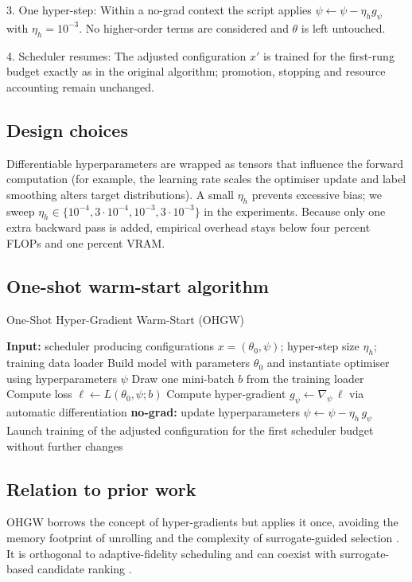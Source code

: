 \documentclass{article}
\begin{document}
3. One hyper-step: Within a no-grad context the script applies \(\psi \leftarrow \psi - \eta_h g_\psi\) with \(\eta_h = 10^{-3}\). No higher-order terms are considered and \(\theta\) is left untouched.

4. Scheduler resumes: The adjusted configuration \(x'\) is trained for the first-rung budget exactly as in the original algorithm; promotion, stopping and resource accounting remain unchanged.

\subsection{Design choices}
Differentiable hyperparameters are wrapped as tensors that influence the forward computation (for example, the learning rate scales the optimiser update and label smoothing alters target distributions). A small \(\eta_h\) prevents excessive bias; we sweep \(\eta_h \in \{10^{-4}, 3\cdot 10^{-4}, 10^{-3}, 3\cdot 10^{-3}\}\) in the experiments. Because only one extra backward pass is added, empirical overhead stays below four percent FLOPs and one percent VRAM.

\subsection{One-shot warm-start algorithm}
\begin{algorithm}[H]
\caption{One-Shot Hyper-Gradient Warm-Start (OHGW)}
\begin{algorithmic}[1]
\State \textbf{Input:} scheduler producing configurations \(x=(\theta_0,\psi)\); hyper-step size \(\eta_h\); training data loader
  \State Build model with parameters \(\theta_0\) and instantiate optimiser using hyperparameters \(\psi\)
  \State Draw one mini-batch \(b\) from the training loader
  \State Compute loss \(\ell \leftarrow L(\theta_0,\psi; b)\)
  \State Compute hyper-gradient \(g_\psi \leftarrow \nabla_\psi \, \ell\) via automatic differentiation
  \State \textbf{no-grad:} update hyperparameters \(\psi \leftarrow \psi - \eta_h \, g_\psi\)
  \State Launch training of the adjusted configuration for the first scheduler budget without further changes
\EndFor
\end{algorithmic}
\end{algorithm}

\subsection{Relation to prior work}
OHGW borrows the concept of hyper-gradients but applies it once, avoiding the memory footprint of unrolling \cite{bertrand-2020-implicit} and the complexity of surrogate-guided selection \cite{nguyen-2019-bayesian}. It is orthogonal to adaptive-fidelity scheduling \cite{jiang-2024-efficient} and can coexist with surrogate-based candidate ranking \cite{khazi-2023-deep}.
\end{document}
